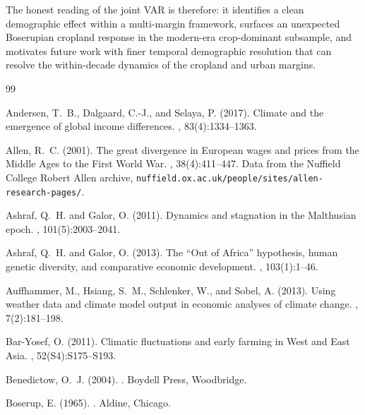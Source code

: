 \documentclass[11pt,letterpaper]{article}
\begin{document}
The honest reading of the joint VAR is therefore: it identifies a clean demographic effect within a multi-margin framework, surfaces an unexpected Boserupian cropland response in the modern-era crop-dominant subsample, and motivates future work with finer temporal demographic resolution that can resolve the within-decade dynamics of the cropland and urban margins.


\begin{thebibliography}{99}

Andersen, T.~B., Dalgaard, C.-J., and Selaya, P. (2017).
\newblock Climate and the emergence of global income differences.
, 83(4):1334--1363.

Allen, R.~C. (2001).
\newblock The great divergence in European wages and prices from the {Middle Ages} to the {First World War}.
, 38(4):411--447.
\newblock Data from the Nuffield College Robert Allen archive,
  \texttt{nuffield.ox.ac.uk/people/sites/allen-research-pages/}.

Ashraf, Q.~H. and Galor, O. (2011).
\newblock Dynamics and stagnation in the Malthusian epoch.
, 101(5):2003--2041.

Ashraf, Q.~H. and Galor, O. (2013).
\newblock The ``Out of Africa'' hypothesis, human genetic diversity, and comparative economic development.
, 103(1):1--46.

Auffhammer, M., Hsiang, S.~M., Schlenker, W., and Sobel, A. (2013).
\newblock Using weather data and climate model output in economic analyses of climate change.
, 7(2):181--198.

Bar-Yosef, O. (2011).
\newblock Climatic fluctuations and early farming in West and East Asia.
, 52(S4):S175--S193.

Benedictow, O.~J. (2004).
.
\newblock Boydell Press, Woodbridge.

Boserup, E. (1965).
.
\newblock Aldine, Chicago.


\end{thebibliography}
\end{document}
